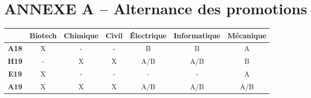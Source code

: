 \section{ANNEXE A – Alternance des promotions}
\begin{tabular}{ccccccc}
\hline
 & Biotech & Chimique & Civil & Électrique & Informatique & Mécanique\\
\hline
\hline
\textbf{A18} & X & - & - & B & B & A\\
\textbf{H19} & - & X & X & A/B & A/B & B\\
\textbf{E19} & X & - & - & - & - & A\\
\textbf{A19} & X & X & X & A/B & A/B & A/B\\
\hline
\end{tabular}